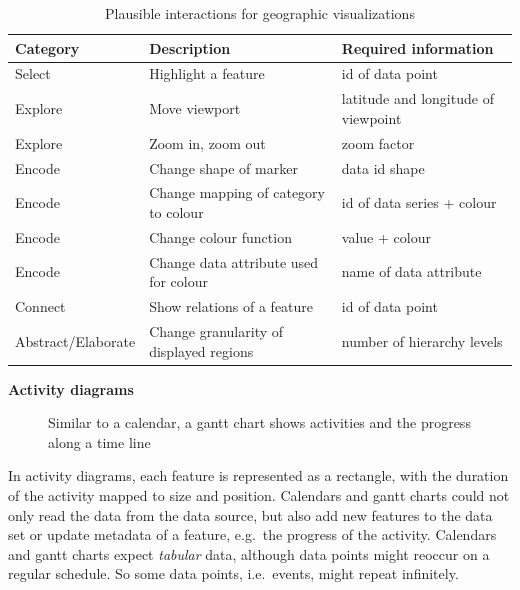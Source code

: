 \begin{table}[H]
  \begin{tabular*}{\textwidth}{lll}
    \bf Category & \bf Description & \bf Required information \\
    \hline
    Select & Highlight a feature & id of data point \\
    Explore & Move viewport & latitude and longitude of viewpoint \\
    Explore & Zoom in, zoom out & zoom factor \\
    Encode & Change shape of marker & data id  shape \\
    Encode & Change mapping of category to colour & id of data series + colour \\
    Encode & Change colour function & value + colour \\
    Encode & Change data attribute used for colour & name of data attribute \\
    Connect & Show relations of a feature & id of data point  \\
    Abstract/Elaborate & Change granularity of displayed regions & number of hierarchy levels \\
  \end{tabular*}
  \caption{Plausible interactions for geographic visualizations}%
  \label{tab:analysis:geographical:interactions}
\end{table}

\textbf{Activity diagrams}
\begin{figure}
  \centering
  \caption{Similar to a calendar, a gantt chart shows activities and the progress along a time line}%
  \label{fig:analysis:temporal}
  \qquad
\end{figure}

In activity diagrams, each feature is represented as a rectangle, with the duration of the activity mapped to size and position.
Calendars and gantt charts could not only read the data from the data source, but also add new features to the data set or update metadata of a feature, e.g.\ the progress of the activity.
Calendars and gantt charts expect \emph{tabular} data, although data points might reoccur on a regular schedule.
So some data points, i.e.\ events, might repeat infinitely.

